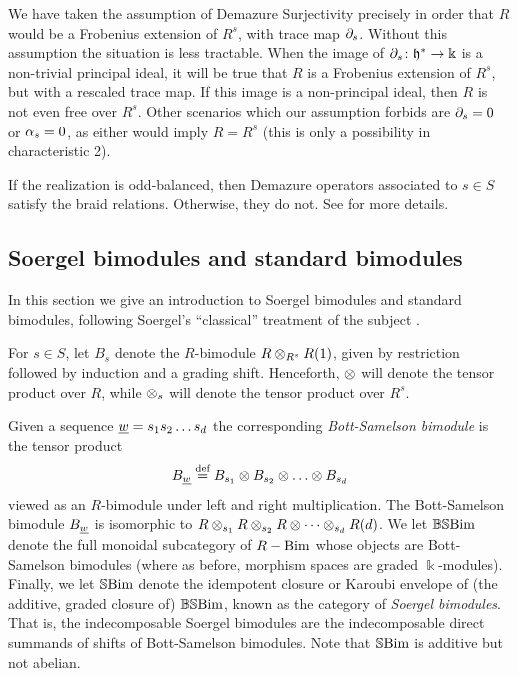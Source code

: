 \begin{remark} We have taken the assumption of Demazure Surjectivity precisely in order that $R$ would be a Frobenius extension of $R^s$, with trace map $\partial_s$. Without this assumption
the situation is less tractable. When the image of $\partial_s \colon {\mathfrak h}^* \rightarrow \Bbbk$ is a non-trivial principal ideal, it will be true that $R$ is a Frobenius extension of $R^s$, but with
a rescaled trace map. If this image is a non-principal ideal, then $R$ is not even free over $R^s$. Other scenarios which our assumption forbids are $\partial_s = 0$ or $\alpha_s = 0$, as either
would imply $R=R^s$ (this is only a possibility in characteristic 2). \end{remark}

\begin{remark} If the realization is odd-balanced, then Demazure operators associated to $s \in S$ satisfy the braid relations. Otherwise, they do not. See \cite{EDihedral} for more
details. \end{remark}

\subsection{Soergel bimodules and standard bimodules}
\label{subsec-soergelandstandard}
In this section we give an introduction to Soergel bimodules and standard bimodules, following Soergel's ``classical'' treatment of the subject \cite{Soe3}.

For $s \in S$, let $B_s$ denote the $R$-bimodule $R \otimes_{R^s} R (1)$, given by restriction followed by induction and a grading shift. Henceforth, $\otimes$ will denote the tensor product over $R$, while $\otimes_s$ will denote the tensor product over $R^s$.

Given a sequence $\underline{w} = s_1s_2 \dots s_d$ the corresponding \emph{Bott-Samelson bimodule} is the tensor product
\[
B_{\underline{w}} \stackrel{\mbox{\scriptsize{def}}}{=} B_{s_1} \otimes B_{s_2} \otimes \ldots \otimes B_{s_d}
\]
viewed as an $R$-bimodule under left and right multiplication. The Bott-Samelson bimodule $B_{\underline{w}}$ is isomorphic to $R \otimes_{s_1} R \otimes_{s_2} R \otimes \cdots \otimes_{s_d} R (d)$. We let $\mathbb{BS}\textrm{Bim}$ denote the full monoidal subcategory of $R-\mathrm{Bim}$ whose objects are Bott-Samelson bimodules (where as before, morphism spaces are graded $\Bbbk$-modules). Finally, we let $\mathbb{S}\textrm{Bim}$ denote the idempotent closure or Karoubi envelope of (the additive, graded closure of) $\mathbb{BS}\textrm{Bim}$, known as the category of \emph{Soergel bimodules}. That is, the indecomposable Soergel bimodules are the indecomposable direct summands of shifts of Bott-Samelson bimodules. Note that $\mathbb{S}\textrm{Bim}$ is additive but not abelian.

